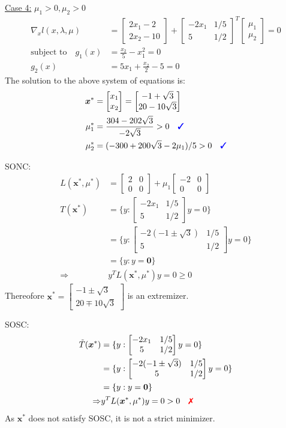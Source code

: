 \documentclass[a4paper,11pt]{article}
\newcommand{\V}[1]{\boldsymbol{#1}}
\newcommand{\mat}[1]{\begin{bmatrix}#1\end{bmatrix}}
\newcommand{\cmark}{{\color{blue}\text{\ding{51}}}}%
\newcommand{\xmark}{{\color{red}\text{\ding{55}}}}%
\begin{document}

\noindent\underline{Case 4:} $\mu_1>0, \mu_2>0$ 
\begin{align*}
 \nabla_x l(x,\lambda,\mu) &= \mat{2x_1 -2\\ 2x_2-10} +\mat{-2x_1 & 1/5\\ 5& 1/2}^T\mat{\mu_1\\ \mu_2} =0\\
 \text{subject to}\quad g_1(x)&=\frac{x_2}{5}-x_1^2 = 0\\
 g_2(x)&=5x_1 +\frac{x_2}{2}-5= 0
\end{align*}
The solution to the above system of equations is:
\begin{align*}
 \V{x}^* &= \mat{x_1\\x_2} = \mat{-1+\sqrt{3}\\ 20-10\sqrt{3}}\\
 \mu_1^* &= \frac{304-202\sqrt{3}}{-2\sqrt{3}}>0 \quad \cmark\\
 \mu_2^* &= (-300 + 200\sqrt{3} -2\mu_1)/5 >0 \quad\cmark
\end{align*}

\noindent SONC:
\begin{align*}
 L(\V{x}^*,\mu^*)& = \mat{2&0\\0&0} +\mu_1\mat{-2 & 0\\ 0& 0}\\
 T(\V{x}^*)&= \{y: \mat{-2x_1 & 1/5\\ 5&  1/2}y = 0 \}\\
 &= \{y: \mat{-2(-1\pm\sqrt{3})& 1/5\\ 5&  1/2}y = 0 \}\\
 &= \{y: y=\V{0}\}\\
 \Rightarrow& y^TL(\V{x}^*,\mu^*)y = 0 \geq 0
\end{align*}
Thereofore $\V{x}^*  = \mat{-1\pm\sqrt{3}\\ 20\mp10\sqrt{3}}$ is an extremizer.

\noindent SOSC:
\begin{align*}
 \tilde{T}(\V{x}^*)&= \{y: \mat{-2x_1 & 1/5\\ 5&  1/2}y = 0 \}\\
 &= \{y: \mat{-2(-1\pm\sqrt{3})& 1/5\\ 5&  1/2}y = 0 \}\\
 &= \{y: y=\V{0}\}\\
 \Rightarrow& y^TL(\V{x}^*,\mu^*)y = 0 > 0 \quad \xmark
\end{align*}
As $\V{x}^*$ does not satisfy SOSC, it is not a strict minimizer.
\end{document}
